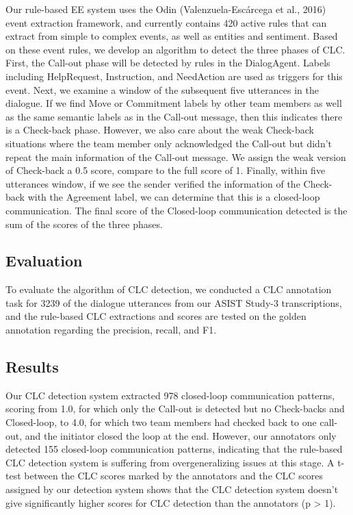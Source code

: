 Our rule-based EE system uses the Odin (Valenzuela-Escárcega et al., 2016)
event extraction framework, and currently contains 420 active rules that can
extract from simple to complex events, as well as entities and sentiment. Based
on these event rules, we develop an algorithm to detect the three phases of
CLC. First, the Call-out phase will be detected by rules in the DialogAgent.
Labels including HelpRequest, Instruction, and NeedAction are used as triggers
for this event. Next, we examine a window of the subsequent five utterances in
the dialogue.  If we find Move or Commitment labels by other team members as
well as the same semantic labels as in the Call-out message, then this
indicates there is a Check-back phase. However, we also care about the weak
Check-back situations where the team member only acknowledged the Call-out but
didn’t repeat the main information of the Call-out message. We assign the weak
version of Check-back a 0.5 score, compare to the full score of 1.  Finally,
within five utterances window, if we see the sender verified the information of
the Check-back with the Agreement label, we can determine that this is a
closed-loop communication. The final score of the Closed-loop communication
detected is the sum of the scores of the three phases.

\subsection{Evaluation}

To evaluate the algorithm of CLC detection, we conducted a CLC annotation task
for 3239 of the dialogue utterances from our ASIST Study-3 transcriptions, and
the rule-based CLC extractions and scores are tested on the golden annotation
regarding the precision, recall, and F1.


\subsection{Results}

Our CLC detection system extracted 978 closed-loop communication patterns,
scoring from 1.0, for which only the Call-out is detected but no Check-backs
and Closed-loop, to 4.0, for which two team members had checked back to one
call-out, and the initiator closed the loop at the end. However, our annotators
only detected 155 closed-loop communication patterns, indicating that the
rule-based CLC detection system is suffering from overgeneralizing issues at
this stage. A t-test between the CLC scores marked by the annotators and the
CLC scores assigned by our detection system shows that the CLC detection system
doesn’t give significantly higher scores for CLC detection than the annotators
(p > 1). 

